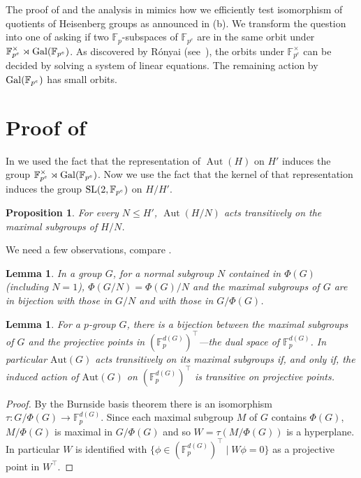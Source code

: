 \documentclass{toc}
\numberwithin{equation}{section}
\theoremstyle{plain}       %
\newtheorem{lem}[equation]{Lemma}
\newtheorem{prop}[equation]{Proposition}
\theoremstyle{remark}
\theoremstyle{definition}
\numberwithin{figure}{section}
\numberwithin{table}{section}
\newcommand{\bbF}{\mathbb{F}}  %
\DeclareMathOperator{\Aut}{Aut}  %
\begin{document}
\begin{remark}\label{rem:general-iso}
  The proof of  and the analysis in
   mimics how we efficiently test isomorphism of
  quotients of Heisenberg groups as announced in (b).  We
  transform the question into one of asking if two $\bbF_p$-subspaces of
  $\bbF_{p^e}$ are in the same orbit under
  $\bbF_{p^e}^{\times}\rtimes {\rm Gal}(\bbF_{p^e})$.  
  As discovered by R{\'o}nyai 
%
  (see~\cite[Lemma~4.8]{LW}),  %
 the orbits under $\bbF_{p^e}^{\times}$ can be decided by solving a system of
 linear equations.  The remaining action by ${\rm Gal}(\bbF_{p^e})$ has small
 orbits.
\end{remark}

\section{Proof of }

In  we used the fact that the representation of
$\Aut(H)$ on $H'$ induces the group $\bbF_{p^e}^{\times}\rtimes{\rm
Gal}(\bbF_{p^e})$.  Now we use the fact that the kernel of that representation
induces the group ${\rm SL}(2,\bbF_{p^e})$ on $H/H'$.


\begin{prop}\label{prop:max-conj}
	For every $N\leq H'$, $\Aut(H/N)$ acts 
	transitively on the maximal subgroups of $H/N$.
\end{prop}

We need a few observations, compare \cite[p. 135 \& 140]{Robinson}.

\begin{lem}\label{lem:phi-stuff}
	In a group $G$, for a normal subgroup $N$ contained in $\Phi(G)$ (including
	$N=1$), $\Phi(G/N)=\Phi(G)/N$ and the maximal subgroups of $G$ are in
	bijection with those in $G/N$ and with those in $G/\Phi(G)$.
\end{lem}
	
\begin{lem}\label{lem:basis-2}
	For a $p$-group $G$, there is a bijection between the maximal subgroups of
	$G$ and the projective points in $(\bbF_p^{d(G)})^{\top}$---the dual space
	of $\bbF_p^{d(G)}$.  In particular $\mathrm{Aut}(G)$ acts transitively on
	its maximal subgroups if, and only if, the induced action of
	$\mathrm{Aut}(G)$ on $(\bbF_p^{d(G)})^{\top}$ is transitive on projective
	points.
\end{lem}
\begin{proof}
	By the Burnside basis theorem there is an isomorphism $\tau:G/\Phi(G) \to
\bbF_p^{d(G)}$.  Since each maximal subgroup $M$ of $G$ contains $\Phi(G)$,
$M/\Phi(G)$ is maximal in $G/\Phi(G)$ and so $W=\tau(M/\Phi(G))$ is a
hyperplane.  In particular $W$ is identified with
$\{\phi\in(\bbF_p^{d(G)})^{\top} \mid W\phi=0\}$ as a projective point in
$W^{\top}$.
\end{proof}
\end{document}
